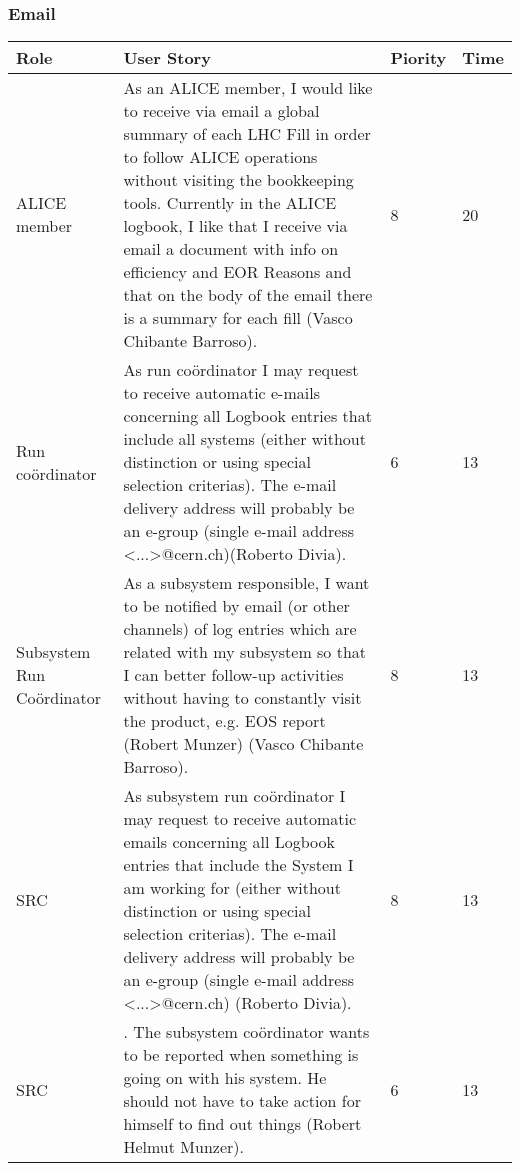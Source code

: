 \subsubsection{Email}
\begin{longtable}{ | p{2cm} | p{8cm} | p{1.5cm} | l |}
\hline
Role & User Story & Piority & Time \\ \hline
ALICE member & As an ALICE member, I would like to receive via email a global summary of each LHC Fill in order to follow ALICE operations without visiting the bookkeeping tools. Currently in the ALICE logbook, I like that I receive via email a document with info on efficiency and EOR Reasons and that on the body of the email there is a summary for
each fill (Vasco Chibante Barroso). & 8 & 20 \\ \hline
Run coördinator & As run coördinator I may request to receive automatic e-mails concerning all Logbook entries that include all systems (either without distinction or using special selection criterias). The e-mail delivery address will probably be an e-group (single e-mail address <...>@cern.ch)(Roberto Divia). & 6 & 13 \\ \hline
Subsystem Run Coördinator &  As a subsystem responsible, I want to be notified by email (or other
channels) of log entries which are related with my subsystem so that I can better follow-up activities without having to constantly visit the product, e.g. EOS report (Robert Munzer) (Vasco Chibante Barroso). & 8 & 13 \\ \hline
SRC & As subsystem run coördinator I may request to receive automatic emails concerning all Logbook entries that include the System I am working for (either without distinction or using special selection criterias). The e-mail delivery address will probably be an e-group (single e-mail address <...>@cern.ch) (Roberto Divia). & 8 & 13 \\ \hline
SRC & . The subsystem coördinator wants to be reported when something is going on with his system. He should not have to take action for himself to find out things (Robert Helmut Munzer). & 6 & 13 \\ \hline

\end{longtable}
\newpage
